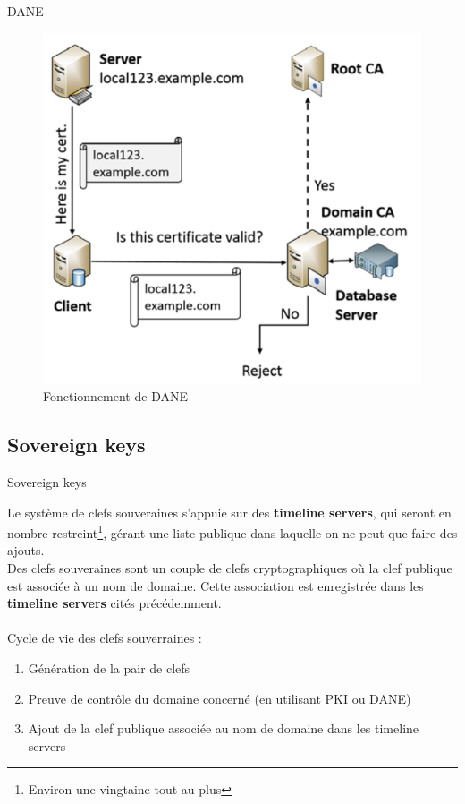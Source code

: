 \documentclass{bredelebeamer}
\begin{document}
\begin{frame}{DANE}

	\begin{figure}
		\centering
		\includegraphics[scale=0.35]{./../danereq.png}
		\caption{Fonctionnement de DANE}
	\end{figure}

\end{frame}

\subsection{Sovereign keys}

\begin{frame}{Sovereign keys}

	Le système de clefs souveraines s'appuie sur des \textbf{timeline servers}, qui seront en nombre restreint\footnote{Environ une vingtaine tout au plus}, gérant une liste publique dans laquelle on ne peut que faire des ajouts.\\
	
	Des clefs souveraines sont un couple de clefs cryptographiques où la clef publique est associée à un nom de domaine. Cette association est enregistrée dans les \textbf{timeline servers} cités précédemment.\\
	\hfill\\
	Cycle de vie des clefs souverraines :
	\begin{enumerate}
		\item Génération de la pair de clefs 
		\item Preuve de contrôle du domaine concerné (en utilisant PKI ou DANE)
		\item Ajout de la clef publique associée au nom de domaine dans les timeline servers
	\end{enumerate}
	
\end{frame}
\end{document}
